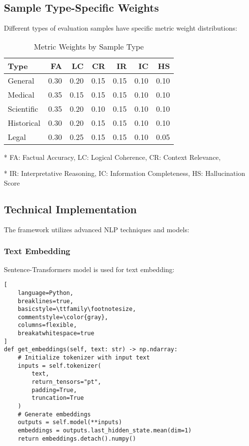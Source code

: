 \subsection{Sample Type-Specific Weights}
Different types of evaluation samples have specific metric weight distributions:

\begin{table}[H]
\centering
\small
\begin{tabular}{|l|r|r|r|r|r|r|}
\hline
\textbf{Type} & \textbf{FA} & \textbf{LC} & \textbf{CR} & \textbf{IR} & \textbf{IC} & \textbf{HS} \\
\hline
General & 0.30 & 0.20 & 0.15 & 0.15 & 0.10 & 0.10 \\
Medical & 0.35 & 0.15 & 0.15 & 0.15 & 0.10 & 0.10 \\
Scientific & 0.35 & 0.20 & 0.10 & 0.15 & 0.10 & 0.10 \\
Historical & 0.30 & 0.20 & 0.15 & 0.15 & 0.10 & 0.10 \\
Legal & 0.30 & 0.25 & 0.15 & 0.15 & 0.10 & 0.05 \\
\hline
\end{tabular}
\caption{Metric Weights by Sample Type}
\label{tab:metric_weights}
\begin{threeparttable}
\begin{tablenotes}
\small
\item[*] FA: Factual Accuracy, LC: Logical Coherence, CR: Context Relevance,
\item[*] IR: Interpretative Reasoning, IC: Information Completeness, HS: Hallucination Score
\end{tablenotes}
\end{threeparttable}
\end{table}

\subsection{Technical Implementation}
The framework utilizes advanced NLP techniques and models:

\subsubsection{Text Embedding}
Sentence-Transformers model is used for text embedding:
\begin{lstlisting}[
    language=Python,
    breaklines=true,
    basicstyle=\ttfamily\footnotesize,
    commentstyle=\color{gray},
    columns=flexible,
    breakatwhitespace=true
]
def get_embeddings(self, text: str) -> np.ndarray:
    # Initialize tokenizer with input text
    inputs = self.tokenizer(
        text, 
        return_tensors="pt", 
        padding=True, 
        truncation=True
    )
    # Generate embeddings
    outputs = self.model(**inputs)
    embeddings = outputs.last_hidden_state.mean(dim=1)
    return embeddings.detach().numpy()
\end{lstlisting}

